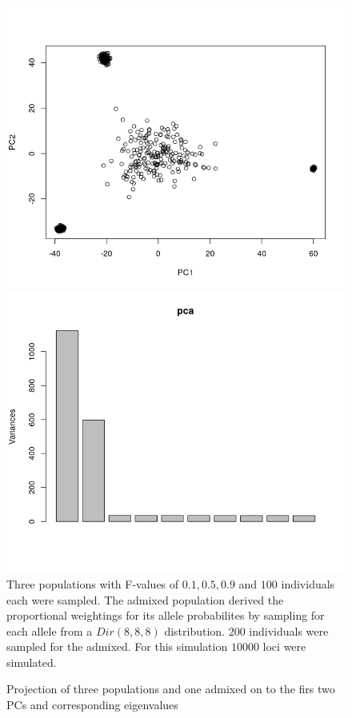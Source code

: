 \documentclass[a4paper, 11pt]{article}
\begin{document}
\begin{figure}[h!]
\caption{Projection of three populations and one admixed on to the firs two PCs and corresponding eigenvalues}
\includegraphics[scale=0.41]{Rplot_projection}
\includegraphics[scale=0.41]{Rplot_eigenvalues}
\\Three populations with F-values  of $0.1, 0.5, 0.9$ and $100$ individuals each were sampled. The admixed population derived the proportional weightings for its allele probabilites by sampling for each allele from a $Dir(8, 8, 8)$ distribution. $200$ individuals were sampled for the admixed. For this simulation $10000$ loci were simulated.
\centering
\end{figure}
\end{document}
